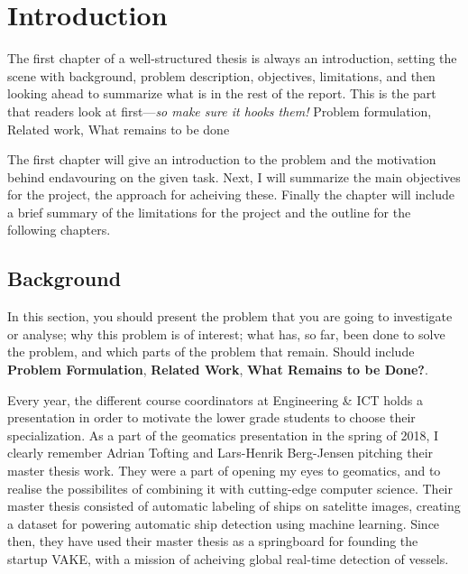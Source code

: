 \chapter{Introduction}
\label{chp:introduction}
\begin{info}
	The first chapter of a well-structured thesis is always an introduction, setting the scene with background, problem description, objectives, limitations, and then looking ahead to summarize what is in the rest of the report. This is the part that readers look at first---\emph{so make sure it hooks them!} Problem formulation, Related work, What remains to be done
\end{info}
The first chapter will give an introduction to the problem and the motivation behind endavouring on the given task. Next, I will summarize the main objectives for the project, the approach for acheiving these. Finally the chapter will include a brief summary of the limitations for the project and the outline for the following chapters. 

\section{Background}
\label{sec:background}
\begin{info}
	In this section, you should present the problem that you are going to investigate or analyse; why this problem is of interest; what has, so far, been done to solve the problem, and which parts of the problem that remain. Should include \textbf{Problem Formulation}, \textbf{Related Work}, \textbf{What Remains to be Done?}.
\end{info}

Every year, the different course coordinators at Engineering \& ICT holds a presentation in order to motivate the lower grade students to choose their specialization. As a part of the geomatics presentation in the spring of 2018, I clearly remember Adrian Tofting and Lars-Henrik Berg-Jensen pitching their master thesis work. They were a part of opening my eyes to geomatics, and to realise the possibilites of combining it with cutting-edge computer science. Their master thesis consisted of automatic labeling of ships on satelitte images, creating a dataset for powering automatic ship detection using machine learning. Since then, they have used their master thesis as a springboard for founding the startup VAKE, with a mission of acheiving global real-time detection of vessels. 

